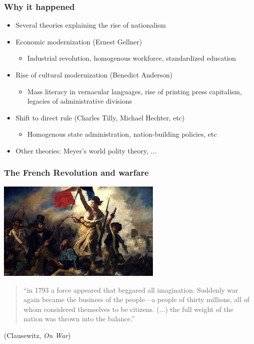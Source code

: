 \documentclass[aspectratio=43]{beamer}
\begin{document}
\begin{frame}
\frametitle{Why it happened}
\centering

\begin{itemize}[<+->]
  \item Several theories explaining the rise of nationalism
  \item Economic modernization (Ernest Gellner)
  \begin{itemize}
    \item Industrial revolution, homogenous workforce, standardized education
  \end{itemize}
  \item Rise of cultural modernization (Benedict Anderson)
  \begin{itemize}
    \item Mass literacy in vernacular languages, rise of printing press capitalism, legacies of administrative divisions
  \end{itemize}
  \item Shift to direct rule (Charles Tilly, Michael Hechter, etc)
  \begin{itemize}
    \item Homogenous state administration, nation-building policies, etc
  \end{itemize}
  \item Other theories: Meyer's world polity theory, ...
\end{itemize}

\end{frame}

\begin{frame}
\frametitle{The French Revolution and warfare}
\centering

\includegraphics[width = 0.6\textwidth]{img/delacroix}


\vspace{15pt}

\begin{quote}
  {\small ``in 1793 a force appeared that beggared all imagination. Suddenly war again became the business of the people---a people of thirty millions, all of whom considered themselves to be citizens. (...) the full weight of the nation was thrown into the balance.''}
\end{quote}

{\small (Clausewitz, \textit{On War})}

\end{frame}
\end{document}
